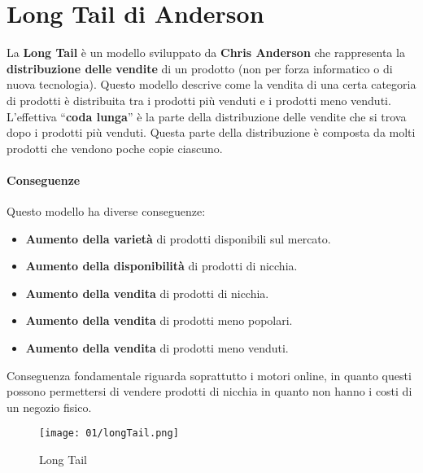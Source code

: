\section{Long Tail di Anderson}
    La \textbf{Long Tail} è un modello sviluppato da \textbf{Chris Anderson} che rappresenta la \textbf{distribuzione delle vendite} di un prodotto (non per forza informatico o di nuova tecnologia). Questo modello descrive come la vendita di una certa categoria di prodotti è distribuita tra i prodotti più venduti e i prodotti meno venduti.
    L'effettiva ``\textbf{coda lunga}'' è la parte della distribuzione delle vendite che si trova dopo i prodotti più venduti. Questa parte della distribuzione è composta da molti prodotti che vendono poche copie ciascuno.
    \paragraph{Conseguenze} Questo modello ha diverse conseguenze:
        \begin{itemize}
            \item \textbf{Aumento della varietà} di prodotti disponibili sul mercato.
            \item \textbf{Aumento della disponibilità} di prodotti di nicchia.
            \item \textbf{Aumento della vendita} di prodotti di nicchia.
            \item \textbf{Aumento della vendita} di prodotti meno popolari.
            \item \textbf{Aumento della vendita} di prodotti meno venduti.
        \end{itemize}
        Conseguenza fondamentale riguarda soprattutto i motori online, in quanto questi possono permettersi di vendere prodotti di nicchia in quanto non hanno i costi di un negozio fisico.
        \begin{figure}[H]
            \centering
            \texttt{[image: 01/longTail.png]}
            \caption{Long Tail}
        \end{figure}
